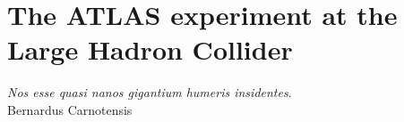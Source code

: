 \chapter{The ATLAS experiment at the Large Hadron Collider}
\label{chp:det}

\begin{flushright}
\begin{small}
\emph{Nos esse quasi nanos gigantium humeris insidentes}.\\Bernardus Carnotensis
\end{small}
\end{flushright}

\minitoc






